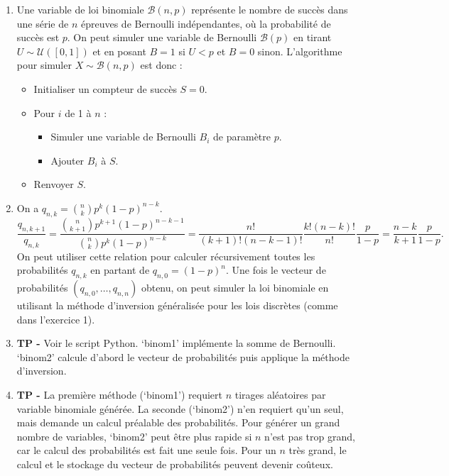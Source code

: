 \documentclass[solutions]{exercices}
\begin{document}
\begin{solution}
\begin{enumerate}
  \item Une variable de loi binomiale $\mathcal{B}(n,p)$ représente le nombre de succès dans une série de $n$ épreuves de Bernoulli indépendantes, où la probabilité de succès est $p$. On peut simuler une variable de Bernoulli $\mathcal{B}(p)$ en tirant $U \sim \mathcal{U}([0,1])$ et en posant $B=1$ si $U < p$ et $B=0$ sinon.
  L'algorithme pour simuler $X \sim \mathcal{B}(n,p)$ est donc :
  \begin{itemize}
      \item Initialiser un compteur de succès $S=0$.
      \item Pour $i$ de 1 à $n$ :
      \begin{itemize}
          \item Simuler une variable de Bernoulli $B_i$ de paramètre $p$.
          \item Ajouter $B_i$ à $S$.
      \end{itemize}
      \item Renvoyer $S$.
  \end{itemize}
  \item On a $q_{n,k} = \binom{n}{k} p^k (1-p)^{n-k}$.
  \[ \frac{q_{n,k+1}}{q_{n,k}} = \frac{\binom{n}{k+1} p^{k+1} (1-p)^{n-k-1}}{\binom{n}{k} p^k (1-p)^{n-k}} = \frac{n!}{(k+1)!(n-k-1)!} \frac{k!(n-k)!}{n!} \frac{p}{1-p} = \frac{n-k}{k+1} \frac{p}{1-p}. \]
  On peut utiliser cette relation pour calculer récursivement toutes les probabilités $q_{n,k}$ en partant de $q_{n,0}=(1-p)^n$. Une fois le vecteur de probabilités $(q_{n,0}, \dots, q_{n,n})$ obtenu, on peut simuler la loi binomiale en utilisant la méthode d'inversion généralisée pour les lois discrètes (comme dans l'exercice 1).
  \item \textbf{TP -} Voir le script Python. `binom1' implémente la somme de Bernoulli. `binom2' calcule d'abord le vecteur de probabilités puis applique la méthode d'inversion.
  \item \textbf{TP -} La première méthode (`binom1') requiert $n$ tirages aléatoires par variable binomiale générée. La seconde (`binom2') n'en requiert qu'un seul, mais demande un calcul préalable des probabilités. Pour générer un grand nombre de variables, `binom2' peut être plus rapide si $n$ n'est pas trop grand, car le calcul des probabilités est fait une seule fois. Pour un $n$ très grand, le calcul et le stockage du vecteur de probabilités peuvent devenir coûteux.
\end{enumerate}
\end{solution}
\end{document}
